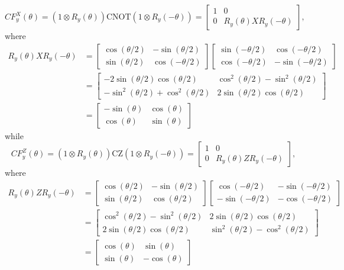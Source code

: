 \documentclass[11pt, oneside]{article}   	%
\begin{document}
\begin{equation}
CF^X_y(\theta) = (1 \otimes R_y(\theta)) \mathrm{CNOT} (1 \otimes R_y(-\theta)) = 
\begin{bmatrix}
1 & 0 \\
0 & R_y(\theta) X R_y(-\theta)
\end{bmatrix},
\end{equation}
where
\begin{align}
R_y(\theta) X R_y(-\theta) &= 
\begin{bmatrix}
\cos(\theta/2) & -\sin(\theta/2) \\
\sin(\theta/2) & \cos(-\theta/2)
\end{bmatrix} 
\begin{bmatrix}
\sin(-\theta/2) & \cos(-\theta/2) \\
\cos(-\theta/2) & -\sin(-\theta/2)
\end{bmatrix} \\
&=
\begin{bmatrix}
-2 \sin(\theta/2) \cos(\theta/2) & \cos^2(\theta/2) - \sin^2(\theta/2) \\
- \sin^2(\theta/2) + \cos^2(\theta/2) & 2 \sin(\theta/2) \cos(\theta/2)
\end{bmatrix} \\
&=
\begin{bmatrix}
-\sin(\theta) & \cos(\theta) \\
\cos(\theta) & \sin(\theta)
\end{bmatrix}
\end{align}
while
\begin{equation}
CF^Z_y(\theta) = (1 \otimes R_y(\theta)) \mathrm{CZ} (1 \otimes R_y(-\theta)) = 
\begin{bmatrix}
1 & 0 \\
0 & R_y(\theta) Z R_y(-\theta)
\end{bmatrix},
\end{equation}
where
\begin{align}
R_y(\theta) Z R_y(-\theta) &= 
\begin{bmatrix}
\cos(\theta/2) & -\sin(\theta/2) \\
\sin(\theta/2) & \cos(\theta/2)
\end{bmatrix} 
\begin{bmatrix}
\cos(-\theta/2) & -\sin(-\theta/2) \\
-\sin(-\theta/2) & -\cos(-\theta/2)
\end{bmatrix} \\
&=
\begin{bmatrix}
\cos^2(\theta/2) - \sin^2(\theta/2) & 2 \sin(\theta/2) \cos(\theta/2) \\
2 \sin(\theta/2) \cos(\theta/2) & \sin^2(\theta/2) - \cos^2(\theta/2)
\end{bmatrix} \\
&=
\begin{bmatrix}
\cos(\theta) & \sin(\theta) \\
\sin(\theta) & -\cos(\theta)
\end{bmatrix}
\end{align}
\end{document}
